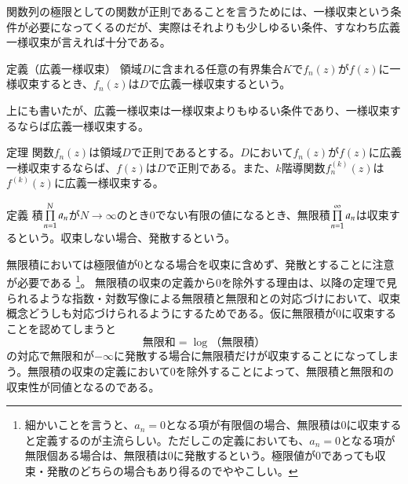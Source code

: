 \documentclass[11pt,b5paper,papersize,dvipdfmx]{jsbook}
\begin{document}
関数列の極限としての関数が正則であることを言うためには、一様収束という条件が必要になってくるのだが、実際はそれよりも少しゆるい条件、すなわち広義一様収束が言えれば十分である。
\begin{thm}{定義（広義一様収束）}
  領域$D$に含まれる任意の有界集合$K$で$f_n(z)$が$f(z)$に一様収束するとき、$f_n(z)$は$D$で広義一様収束するという。
\end{thm}
\begin{remark}
  上にも書いたが、広義一様収束は一様収束よりもゆるい条件であり、一様収束するならば広義一様収束する。
\end{remark}

\begin{thm}{定理}
  関数$f_n(z)$は領域$D$で正則であるとする。$D$において$f_n(z)$が$f(z)$に広義一様収束するならば、$f(z)$は$D$で正則である。また、$k$階導関数$f^{(k)}_n(z)$は$f^{(k)}(z)$に広義一様収束する。
\end{thm}

%
\begin{thm}{定義}
  積$\prod\limits_{n=1}^N a_n$が$N\to\infty$のとき$0$でない有限の値になるとき、無限積$\prod\limits_{n=1}^\infty a_n$は収束するという。収束しない場合、発散するという。
\end{thm}
%
\begin{remark}
  無限積においては極限値が$0$となる場合を収束に含めず、発散とすることに注意が必要である
  \footnote{
    細かいことを言うと、$a_n=0$となる項が有限個の場合、無限積は$0$に収束すると定義するのが主流らしい。ただしこの定義においても、$a_n=0$となる項が無限個ある場合は、無限積は$0$に発散するという。極限値が$0$であっても収束・発散のどちらの場合もあり得るのでややこしい。
  }。
  無限積の収束の定義から$0$を除外する理由は、以降の定理で見られるような指数・対数写像による無限積と無限和との対応づけにおいて、収束概念どうしも対応づけられるようにするためである。仮に無限積が$0$に収束することを認めてしまうと
  $$%
    \text{無限和} = \log\! \text{（無限積）}
  $$%
  の対応で無限和が$-\infty$に発散する場合に無限積だけが収束することになってしまう。無限積の収束の定義において$0$を除外することによって、無限積と無限和の収束性が同値となるのである。
\end{remark}
\end{document}
